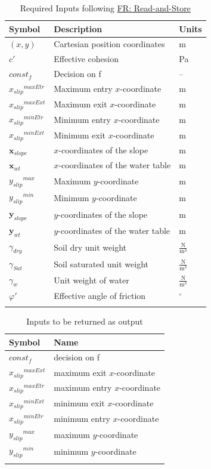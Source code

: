\documentclass[12pt]{article}
\begin{document}
\begin{longtable}{l l l}
\toprule
\textbf{Symbol} & \textbf{Description} & \textbf{Units}
\\
\midrule
\endhead
$(x,y)$ & Cartesian position coordinates & m
\\
$c'$ & Effective cohesion & Pa
\\
$const_f$ & Decision on f & --
\\
${{x_{slip}}^{maxEtr}}$ & Maximum entry $x$-coordinate & m
\\
${{x_{slip}}^{maxExt}}$ & Maximum exit $x$-coordinate & m
\\
${{x_{slip}}^{minEtr}}$ & Minimum entry $x$-coordinate & m
\\
${{x_{slip}}^{minExt}}$ & Minimum exit $x$-coordinate & m
\\
${\mathbf{x}_{slope}}$ & $x$-coordinates of the slope & m
\\
${\mathbf{x}_{wt}}$ & $x$-coordinates of the water table & m
\\
${{y_{slip}}^{max}}$ & Maximum $y$-coordinate & m
\\
${{y_{slip}}^{min}}$ & Minimum $y$-coordinate & m
\\
${\mathbf{y}_{slope}}$ & $y$-coordinates of the slope & m
\\
${\mathbf{y}_{wt}}$ & $y$-coordinates of the water table & m
\\
${γ_{dry}}$ & Soil dry unit weight & $\frac{\text{N}}{\text{m}^{3}}$
\\
${γ_{Sat}}$ & Soil saturated unit weight & $\frac{\text{N}}{\text{m}^{3}}$
\\
${γ_{w}}$ & Unit weight of water & $\frac{\text{N}}{\text{m}^{3}}$
\\
$φ'$ & Effective angle of friction & ${}^{\circ}$
\\
\bottomrule
\caption{Required Inputs following \hyperref[readAndStore]{FR: Read-and-Store}}
\label{Table:ReqInputs}
\end{longtable}
\begin{longtable}{l l}
\toprule
\textbf{Symbol} & \textbf{Name}
\\
\midrule
\endhead
$const_f$ & decision on f
\\
${{x_{slip}}^{maxExt}}$ & maximum exit $x$-coordinate
\\
${{x_{slip}}^{maxEtr}}$ & maximum entry $x$-coordinate
\\
${{x_{slip}}^{minExt}}$ & minimum exit $x$-coordinate
\\
${{x_{slip}}^{minEtr}}$ & minimum entry $x$-coordinate
\\
${{y_{slip}}^{max}}$ & maximum $y$-coordinate
\\
${{y_{slip}}^{min}}$ & minimum $y$-coordinate
\\
\bottomrule
\caption{Inputs to be returned as output}
\label{Table:inputsToOutputTable}
\end{longtable}
\end{document}

